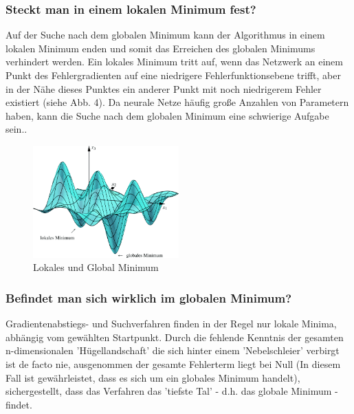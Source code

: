 \subsubsection{Steckt man in einem lokalen Minimum fest?}\label{subsec:gradientenverfahren:fehlerquellen_lokalen_minimum}
  Auf der Suche nach dem globalen Minimum kann der Algorithmus in einem lokalen Minimum enden und somit das Erreichen des globalen Minimums verhindert werden.
  Ein lokales Minimum tritt auf, wenn das Netzwerk an einem Punkt des Fehlergradienten auf eine niedrigere Fehlerfunktionsebene trifft, aber in der Nähe dieses Punktes ein anderer Punkt mit noch niedrigerem Fehler existiert (siehe Abb. 4).
  Da neurale Netze häufig große Anzahlen von Parametern haben, kann die Suche nach dem globalen Minimum eine schwierige Aufgabe sein.\cite{HS97}.
  \\
  \begin{figure}[ht]
    \centering
    \includegraphics[width=0.5\textwidth]{Sources/03-3.3.2_3-dimensionaler_abstieg.png}
    \caption{Lokales und Global Minimum}
    \label{subsec:lokale-globale-minima}
\end{figure}

\subsubsection{Befindet man sich wirklich im globalen Minimum?}\label{subsec:gradientenverfahren:fehlerquellen_globalen_minimum}
  Gradientenabstiegs- und Suchverfahren finden in der Regel nur lokale Minima, abhängig vom gewählten Startpunkt.
  Durch die fehlende Kenntnis der gesamten n-dimensionalen 'Hügellandschaft' die sich hinter einem 'Nebelschleier' verbirgt  ist de facto nie, ausgenommen der gesamte Fehlerterm liegt bei Null (In diesem Fall ist gewährleistet, dass es sich um ein globales Minimum handelt), sichergestellt,
  dass das Verfahren das 'tiefste Tal' - d.h. das globale Minimum - findet.

